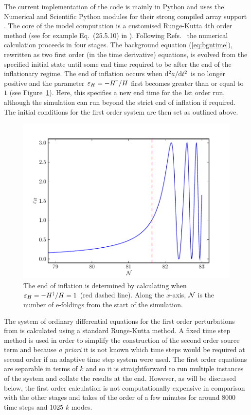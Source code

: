 The current implementation of the code is mainly in Python and uses the
Numerical and Scientific Python modules for their strong compiled array support
\cite{scipy}. The core of the model computation is a customised
Runge-Kutta 4th order method (see for example Eq.~(25.5.10) in
\cite{abramowitz+stegun}).  Following
Refs.~\cite{Martin:2006rs,Ringeval:2007am} the numerical calculation
proceeds in four stages. The background equation (\ref{eq:bgntime}),
rewritten as two first order (in the time derivative) equations, is
evolved from the specified initial state until some end time required
to be after the end of the inflationary regime.  The end of inflation
occurs when $\mathrm{d}^2a/\mathrm{d} t^2$ is no longer positive and the parameter
$\varepsilon_H = -H^{\dagger}/H$ first becomes greater than or equal to $1$
(see Figure~\ref{fig:eps}). Here, this specifies a new end time for the 1st
order run, although the simulation can run beyond the strict end of
inflation if required. The initial conditions for the first order
system are then set as outlined above.
%
\begin{figure}
\centering
 \includegraphics[width=\textwidth]{./numerical/graphs/bgepsilon}
 \caption[Plot of $\varepsilon_H$ near the end of inflation]{The end of inflation is
determined by calculating when
   $\varepsilon_H=-H^{\dagger}/H=1$ (red dashed line). Along the $x$-axis,
   $\mathcal{N}$ is the number of e-foldings from the start of the
   simulation.}
\label{fig:eps}
\end{figure}

The system of ordinary differential equations for the first order
perturbations from  is calculated using a standard
Runge-Kutta method. A fixed time step method is used in order to
simplify the construction of the  second order source term and because
\emph{a priori} it is not known which time steps would be required at
second order if an adaptive time step system were used. The first
order equations are separable in terms of $k$ and so it is
straightforward to run multiple instances of the system and collate
the results at the end. However, as will be discussed below, the first
order calculation is not computationally expensive in comparison with
the other stages and takes of the order of a few minutes for around
$8000$ time steps and $1025$ $k$ modes.


